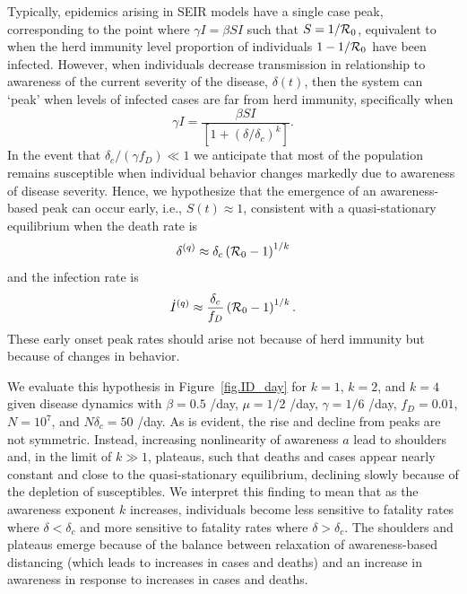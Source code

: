 Typically, epidemics arising in SEIR models have a single case peak, corresponding 
to the point where $\gamma I = \beta S I $ such that 
$S=1/{\cal{R}}_0$, equivalent to when the herd
immunity level proportion of individuals
$1-1/{\cal{R}}_0$ have been infected.
However, when individuals decrease transmission in relationship
to awareness of the current severity of the disease, $\delta(t)$,
then the system can `peak' when levels of infected cases are
far from herd immunity, specifically when
\begin{equation}
\gamma I = \frac{\beta SI}{\left[1+\left(\delta/\delta_c\right)^{k}\right]}.
\end{equation}
In the event that $\delta_c/(\gamma f_D) \ll 1$ we anticipate that most of the population
remains susceptible when individual behavior changes markedly
due to awareness of disease severity. Hence, we hypothesize that the
emergence of an
awareness-based peak can occur early, i.e., $S(t)\approx 1$, consistent
with a quasi-stationary equilibrium when the death rate is
\begin{equation}
\delta^{(q)} \approx \delta_c\left({\cal{R}}_0-1\right)^{1/k}
\end{equation}
and the infection rate is
\begin{equation}
\dot{I}^{(q)} \approx \frac{\delta_c}{f_D}\left({\cal{R}}_0-1\right)^{1/k}.
\end{equation}
These early onset peak rates should arise not because
of herd immunity but because of changes in behavior. 

We evaluate this hypothesis in
Figure~\ref{fig.ID_day} for $k=1$, $k=2$, and $k=4$
given disease dynamics with $\beta=0.5$ /day, $\mu=1/2$ /day, $\gamma=1/6$
/day,
$f_D=0.01$, $N=10^7$, and $N\delta_c=50$ /day.  
As is evident, the rise and decline from peaks are not symmetric. Instead,
increasing nonlinearity of awareness
$a$ lead to shoulders and, in the limit of $k\gg 1$, plateaus, such that
deaths and cases appear nearly constant and close to the quasi-stationary
equilibrium, declining slowly because of the
depletion of susceptibles.  
We interpret this finding to mean that as the awareness exponent $k$ increases,
individuals become less sensitive to fatality rates
where $\delta < \delta_c$ and more sensitive to fatality rates where $\delta > \delta_c$.  
The shoulders and plateaus emerge because of the balance
between relaxation of awareness-based
distancing (which leads to increases in cases and deaths) and an 
increase in awareness in response to increases in cases and deaths.  

